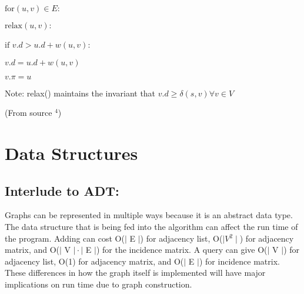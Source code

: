 \documentclass{article}
\begin{document}
\hspace{5 pt}\hspace{5 pt}\hspace{5 pt}$\text{for} (u,v) \in E:$
 
\hspace{5 pt}\hspace{5 pt}\hspace{5 pt}\hspace{5 pt}$\text{relax}(u,v):$
  
\hspace{5 pt}\hspace{5 pt}\hspace{5 pt}\hspace{5 pt}\hspace{5 pt}$\text{if}$ \hspace{1 pt} $v.d > u.d + w(u,v):$
   
\hspace{5 pt}\hspace{5 pt}\hspace{5 pt}\hspace{5 pt}\hspace{5 pt}\hspace{5 pt}$v.d = u.d + w(u,v)$
	
\hspace{5 pt}\hspace{5 pt}\hspace{5 pt}\hspace{5 pt}\hspace{5 pt}\hspace{5 pt}$v.\pi = u$

Note: relax() maintains the invariant that $v.d \geq \delta(s,v) \forall v \in V$

(From source $^4$)

\section{Data Structures}

\subsection{Interlude to ADT:}

Graphs can be represented in multiple ways because it is an abstract data type.  The data structure that is being fed into the algorithm can affect the run time of the program.  Adding can cost O($\mid$ E $\mid$) for adjacency list, O($\mid V{^2} \mid$) for adjacency matrix, and O($\mid$ V $\mid \cdot \mid$ E $\mid$) for the incidence matrix.  A query can give O($\mid$ V $\mid$) for adjacency list, O(1) for adjacency matrix, and O($\mid$ E $\mid$) for incidence matrix. These differences in how the graph itself is implemented will have major implications on run time due to graph construction.
\end{document}
